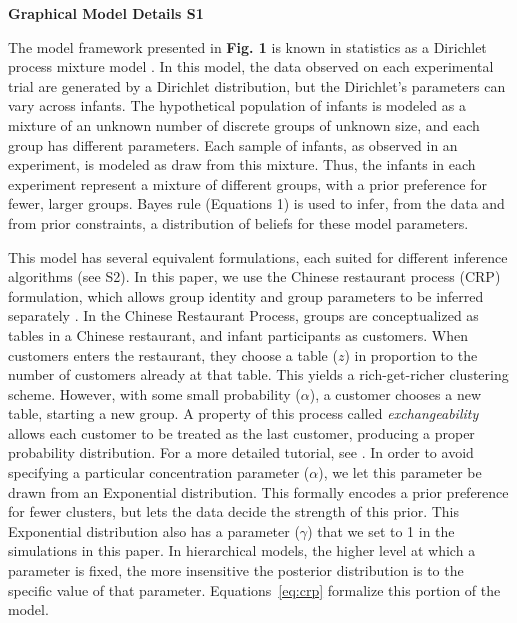 \documentclass[12pt]{article}
\date{}
\begin{document}
\renewcommand\theequation{S\arabic{equation}}

\begin{center}
{\Large
\textbf{Graphical Model Details S1}
}
\end{center}
The model framework presented in \textbf{Fig. 1} is known in statistics as a Dirichlet process mixture model \cite{Antoniak1974, Rasmussen2000}. In this model, the data observed on each experimental trial are generated by a Dirichlet distribution, but the Dirichlet's parameters can vary across infants. The hypothetical population of infants is modeled as a mixture of an unknown number of discrete groups of unknown size, and each group has different parameters. Each sample of infants, as observed in an experiment, is modeled as draw from this mixture. Thus, the infants in each experiment represent a mixture of different groups, with a prior preference for fewer, larger groups. Bayes rule (Equations 1) is used to infer, from the data and from prior constraints, a distribution of beliefs for these model parameters.

This model has several equivalent formulations, each suited for different inference algorithms (see S2). In this paper, we use the Chinese restaurant process (CRP) formulation, which allows group identity and group parameters to be inferred separately \cite{Rasmussen2000, Aldous1985}. In the Chinese Restaurant Process, groups are conceptualized as tables in a Chinese restaurant, and infant participants as customers. When customers enters the restaurant, they choose a table ($z$) in proportion to the number of customers already at that table. This yields a rich-get-richer clustering scheme. However, with some small probability ($\alpha$), a customer chooses a new table, starting a new group. A property of this process called \emph{exchangeability} allows each customer to be treated as the last customer, producing a proper probability distribution. For a more detailed tutorial, see \cite{Goldwater2009a}. In order to avoid specifying a particular concentration parameter ($\alpha$), we let this parameter be drawn from an Exponential distribution. This formally encodes a prior preference for fewer clusters, but lets the data decide the strength of this prior. This Exponential distribution also has a parameter ($\gamma$) that we set to 1 in the simulations in this paper. In hierarchical models, the higher level at which a parameter is fixed, the more insensitive the posterior distribution is to the specific value of that parameter. Equations~\ref{eq:crp} formalize this portion of the model.
\end{document}
